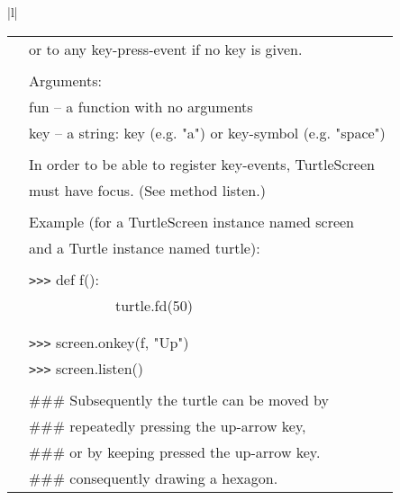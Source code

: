 \begin{center}
{\begin{tabular}{|l|}
\begin{tabular}{p{0.25in}p{4in}}
&        or to any key-press-event if no key is given. \\
&  \\
&        Arguments: \\
&        fun -- a function with no arguments \\
&        key -- a string: key (e.g. "a") or key-symbol (e.g. "space") \\
&  \\
&        In order to be able to register key-events, TurtleScreen \\
&        must have focus. (See method listen.) \\
&  \\
&        Example (for a TurtleScreen instance named screen \\
&        and a Turtle instance named turtle): \\
&  \\
&        \verb+>+\verb+>+\verb+>+ def f(): \\
&                ~~~~~~~~~~~~turtle.fd(50) \\
&  \\
&  \\
&        \verb+>+\verb+>+\verb+>+ screen.onkey(f, "Up") \\
&        \verb+>+\verb+>+\verb+>+ screen.listen() \\
&  \\
&        \#\#\# Subsequently the turtle can be moved by \\
&        \#\#\# repeatedly pressing the up-arrow key, \\
&        \#\#\# or by keeping pressed the up-arrow key. \\
&        \#\#\# consequently drawing a hexagon. \\
\end{tabular} \\ \hline



\end{tabular}}
\end{center}

